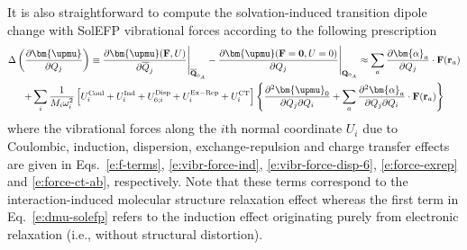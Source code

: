 \documentclass[a4paper,titlepage,twoside,fleqn,12pt]{book}
\newcommand{\BM}[1]{\bm{#1}}
\newcommand{\fderiv}[2]{\ensuremath{
    \frac{\partial #1}{\partial #2}}}
\newcommand{\sderivd}[3]{\ensuremath{
    \frac{\partial^2 #1}{\partial #2 \partial #3}
    }}
\begin{document}
\begin{refsection}
It is also straightforward to compute the 
solvation\hyp{}induced transition dipole change
with SolEFP vibrational forces according to the following prescription
%
\begin{multline} \label{e:dmu-solefp}
\Delta\left(\frac{\partial{\BM \upmu}}{\partial Q_j}\right) \equiv 
 \frac{\partial{\BM \upmu}({\bf F},U)}{\partial\overline {Q}_j} \Bigg|_{\overline{\bf Q}_{0_A}} -  
 \frac{\partial{\BM \upmu}({\bf F}={\bf 0},U=0)}{\partial {Q}_j} \Bigg|_{{\bf Q}_{0_A}} \approx
%
\sum_a 
\fderiv{{\BM \alpha}_{a}}{Q_j} \cdot {\bf F}({\bf r}_a) \\
+
\sum_i 
\frac{1}{M_i\omega_i^2} 
\left[
 U^{\rm Coul}_i   + 
 U^{\rm Ind}_i    +
 U^{\rm Disp}_{6;i}   +
 U^{\rm Ex-Rep}_i +
 U^{\rm CT}_i
\right]
%
\left\{ 
 \sderivd{{\BM \upmu}_0}{Q_j}{Q_i} 
 + \sum_a \sderivd{{\BM \alpha}_{a}}{Q_j}{Q_i} \cdot {\bf F}({\bf r}_a)
%
\right\}  
\end{multline}
%
where the vibrational forces along the $i$th normal coordinate
$U_i$ due to Coulombic, induction, dispersion, exchange\hyp{}repulsion
and charge transfer effects are given in Eqs.~\eqref{e:f-terms},
\eqref{e:vibr-force-ind}, \eqref{e:vibr-force-disp-6}, 
\eqref{e:force-exrep} and \eqref{e:force-ct-ab}, respectively.
Note that these terms correspond to the interaction\hyp{}induced
molecular structure relaxation effect
whereas the first term in Eq.~\eqref{e:dmu-solefp}
refers to the induction effect originating purely from
electronic relaxation (i.e., without structural distortion).


\end{refsection}
\end{document}
